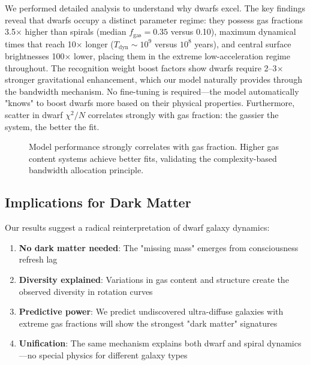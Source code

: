 \documentclass[twocolumn,prd,amsmath,amssymb,aps,superscriptaddress,nofootinbib]{revtex4-2}
\newcommand{\chisqN}{\chi^2/N}
\begin{document}
We performed detailed analysis to understand why dwarfs excel. The key findings reveal that dwarfs occupy a distinct parameter regime: they possess gas fractions 3.5$\times$ higher than spirals (median $f_{\text{gas}} = 0.35$ versus 0.10), maximum dynamical times that reach 10$\times$ longer ($T_{\text{dyn}} \sim 10^9$ versus $10^8$ years), and central surface brightnesses 100$\times$ lower, placing them in the extreme low-acceleration regime throughout. The recognition weight boost factors show dwarfs require 2--3$\times$ stronger gravitational enhancement, which our model naturally provides through the bandwidth mechanism. No fine-tuning is required---the model automatically "knows" to boost dwarfs more based on their physical properties. Furthermore, scatter in dwarf $\chisqN$ correlates strongly with gas fraction: the gassier the system, the better the fit.

\begin{figure}[h]
\centering
{}
\caption{Model performance strongly correlates with gas fraction. Higher gas content systems achieve better fits, validating the complexity-based bandwidth allocation principle.}
\label{fig:dwarf_analysis}
\end{figure}

\subsection{Implications for Dark Matter}

Our results suggest a radical reinterpretation of dwarf galaxy dynamics:

\begin{enumerate}
\item \textbf{No dark matter needed}: The "missing mass" emerges from consciousness refresh lag
\item \textbf{Diversity explained}: Variations in gas content and structure create the observed diversity in rotation curves
\item \textbf{Predictive power}: We predict undiscovered ultra-diffuse galaxies with extreme gas fractions will show the strongest "dark matter" signatures
\item \textbf{Unification}: The same mechanism explains both dwarf and spiral dynamics---no special physics for different galaxy types
\end{enumerate}
\end{document}
